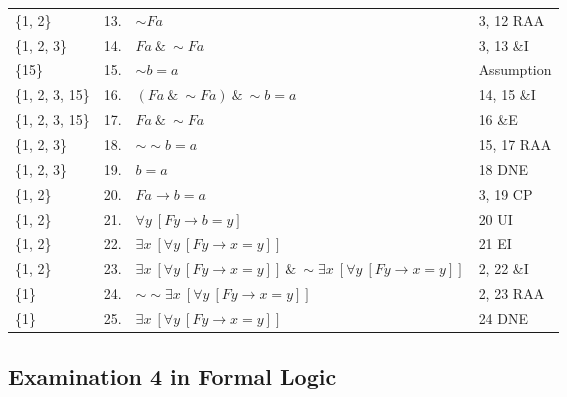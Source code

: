 \documentclass[a4paper,12pt]{article}
\newcommand{\ra}{\rightarrow}
\newcommand{\s}{\sim}
\newcommand{\ta}{ \ \& \ }
\newcommand{\all}{\forall}
\newcommand{\ex}{\exists}
\begin{document}
\begin{enumerate}[label=\arabic*,leftmargin=*]
\begin{enumerate}[label=\arabic*.]
\begin{minipage}{\textwidth}
\begin{tabular}{l l l l}
                        \{1, 2\}        & 13. & $\s Fa$ & 3, 12 RAA\\
                        \{1, 2, 3\}     & 14. & $Fa \ta \s Fa$ & 3, 13 \&I\\
                        \{15\}          & 15. & $\s b=a$ & Assumption\\
                        \{1, 2, 3, 15\} & 16. & $(Fa \ta \s Fa) \ta \s b=a$ & 14, 15 \&I\\
                        \{1, 2, 3, 15\} & 17. & $Fa \ta \s Fa$ & 16 \&E\\
                        \{1, 2, 3\}     & 18. & $\s \s b=a$ & 15, 17 RAA\\
                        \{1, 2, 3\}     & 19. & $b=a$ & 18 DNE\\
                        \{1, 2\}        & 20. & $Fa \ra b=a$ & 3, 19 CP\\
                        \{1, 2\}        & 21. & $\all y \ [Fy \ra b=y]$ & 20 UI\\
                        \{1, 2\}        & 22. & $\ex x \ [\all y \ [Fy \ra x=y]]$ & 21 EI\\
                        \{1, 2\}        & 23. & $\ex x \ [\all y \ [Fy \ra x=y]] \ta \s \ex x \ [\all y \ [Fy \ra x=y]]$ & 2, 22 \&I\\
                        \{1\}           & 24. & $\s \s \ex x \ [\all y \ [Fy \ra x=y]]$ & 2, 23 RAA\\
                        \{1\}           & 25. & $\ex x \ [\all y \ [Fy \ra x=y]]$ & 24 DNE\\
                    \end{tabular}
                    \vspace{1em}
                \end{minipage}
            \end{enumerate}

    \end{enumerate}

    \newpage

    \subsection*{Examination 4 in Formal Logic}
\end{document}
